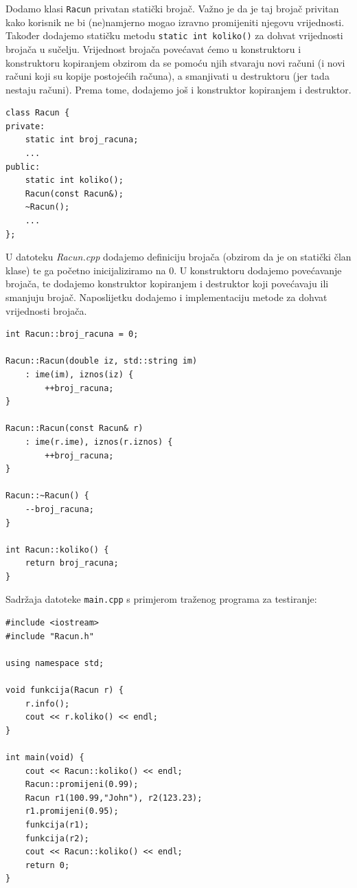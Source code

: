 \begin{rjesenje}
    Dodamo klasi \texttt{Racun} privatan statički brojač.
    Važno je da je taj brojač privitan kako korisnik
    ne bi (ne)namjerno mogao izravno promijeniti njegovu vrijednosti.
    Također dodajemo statičku metodu \texttt{static int koliko()}
    za dohvat vrijednosti brojača u sučelju.
    Vrijednost brojača povećavat ćemo u konstruktoru i konstruktoru kopiranjem obzirom da 
    se pomoću njih stvaraju novi računi
    (i novi računi koji su kopije postojećih računa),
    a smanjivati u destruktoru (jer tada nestaju računi).
    Prema tome, dodajemo još i konstruktor kopiranjem i destruktor.

    \begin{verbatim}
class Racun {
private:
    static int broj_racuna;
    ...
public:
    static int koliko();
    Racun(const Racun&);
    ~Racun();
    ...
};
    \end{verbatim}
U datoteku \textit{Racun.cpp} dodajemo definiciju brojača
(obzirom da je on statički član klase)
te ga početno inicijaliziramo na $0$.
U konstruktoru dodajemo povećavanje brojača,
te dodajemo konstruktor kopiranjem i destruktor koji povećavaju ili smanjuju brojač.
Naposlijetku dodajemo i implementaciju metode za dohvat vrijednosti brojača.

\begin{verbatim}
int Racun::broj_racuna = 0;

Racun::Racun(double iz, std::string im)
    : ime(im), iznos(iz) {
        ++broj_racuna;
}

Racun::Racun(const Racun& r)
    : ime(r.ime), iznos(r.iznos) {
        ++broj_racuna;
}

Racun::~Racun() {
    --broj_racuna;
}

int Racun::koliko() {
    return broj_racuna;
}
\end{verbatim}

Sadržaja datoteke \texttt{main.cpp} s 
primjerom traženog programa za testiranje:

\begin{verbatim}
#include <iostream>
#include "Racun.h"

using namespace std;

void funkcija(Racun r) {
    r.info();
    cout << r.koliko() << endl;
}

int main(void) {
    cout << Racun::koliko() << endl;
    Racun::promijeni(0.99);
    Racun r1(100.99,"John"), r2(123.23);
    r1.promijeni(0.95);
    funkcija(r1);
    funkcija(r2);
    cout << Racun::koliko() << endl;
    return 0;
}
\end{verbatim}
\end{rjesenje}

